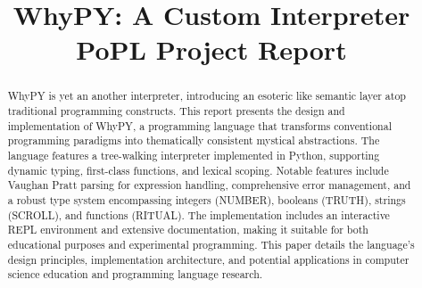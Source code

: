 \documentclass[conference]{IEEEtran}
\begin{document}

\title{WhyPY: A Custom Interpreter \\ \Large{PoPL Project Report}}

\author{
  \and
}

\maketitle

\begin{abstract}
WhyPY is yet an another interpreter, introducing an esoteric like semantic layer atop traditional programming constructs. This report presents the design and implementation of WhyPY, a programming language that transforms conventional programming paradigms into thematically consistent mystical abstractions. The language features a tree-walking interpreter implemented in Python, supporting dynamic typing, first-class functions, and lexical scoping. Notable features include Vaughan Pratt parsing for expression handling, comprehensive error management, and a robust type system encompassing integers (NUMBER), booleans (TRUTH), strings (SCROLL), and functions (RITUAL). The implementation includes an interactive REPL environment and extensive documentation, making it suitable for both educational purposes and experimental programming. This paper details the language's design principles, implementation architecture, and potential applications in computer science education and programming language research.
\end{abstract}
\end{document}
